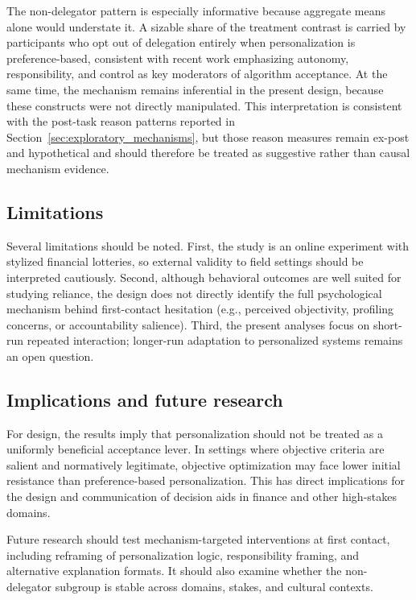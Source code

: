 \documentclass[a4paper, 12pt, fleqn]{article}
\theoremstyle{definition}
\begin{document}
The non-delegator pattern is especially informative because aggregate means alone would understate it. A sizable share of the treatment contrast is carried by participants who opt out of delegation entirely when personalization is preference-based, consistent with recent work emphasizing autonomy, responsibility, and control as key moderators of algorithm acceptance. At the same time, the mechanism remains inferential in the present design, because these constructs were not directly manipulated.
This interpretation is consistent with the post-task reason patterns reported in Section~\ref{sec:exploratory_mechanisms}, but those reason measures remain ex-post and hypothetical and should therefore be treated as suggestive rather than causal mechanism evidence.

\subsection{Limitations}
Several limitations should be noted. First, the study is an online experiment with stylized financial lotteries, so external validity to field settings should be interpreted cautiously. Second, although behavioral outcomes are well suited for studying reliance, the design does not directly identify the full psychological mechanism behind first-contact hesitation (e.g., perceived objectivity, profiling concerns, or accountability salience). Third, the present analyses focus on short-run repeated interaction; longer-run adaptation to personalized systems remains an open question.

\subsection{Implications and future research}
For design, the results imply that personalization should not be treated as a uniformly beneficial acceptance lever. In settings where objective criteria are salient and normatively legitimate, objective optimization may face lower initial resistance than preference-based personalization. This has direct implications for the design and communication of decision aids in finance and other high-stakes domains.

Future research should test mechanism-targeted interventions at first contact, including reframing of personalization logic, responsibility framing, and alternative explanation formats. It should also examine whether the non-delegator subgroup is stable across domains, stakes, and cultural contexts.
\end{document}
